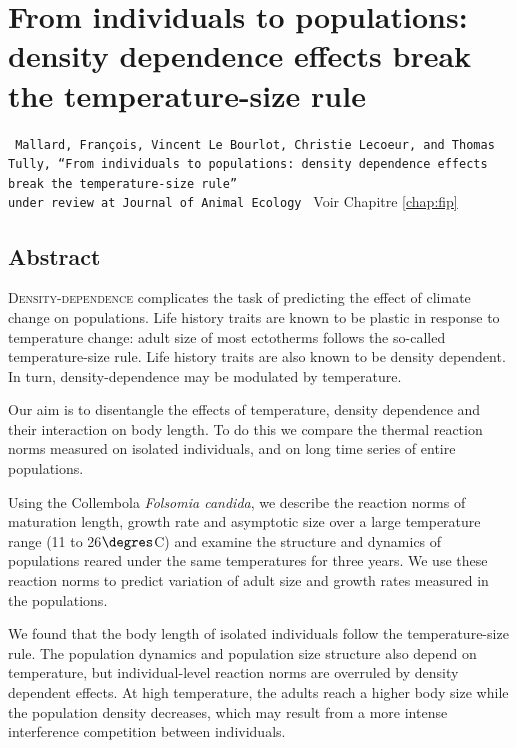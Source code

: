 \chapter{From
individuals to populations:
density dependence effects break the temperature-size rule}
\label{Ann:fip}

\vspace{2cm}
\begin{Spacing}{1}
\texttt{
Mallard, François, Vincent Le Bourlot, Christie Lecoeur, and Thomas Tully, ``From
individuals to populations:
density dependence effects break the temperature-size rule''\\
under review at Journal of Animal Ecology
}
Voir Chapitre \ref{chap:fip}
\end{Spacing}

\section*{Abstract}

\lettrine[lines=3]{D}{ensity-dependence} complicates the task of predicting the
effect of climate change on populations. Life history traits are known to be
plastic in response to temperature change: adult size of most ectotherms follows
the so-called temperature-size rule. Life history traits are also known to be
density dependent. In turn, density-dependence may be modulated by temperature.

Our aim is to disentangle the effects of temperature, density dependence and
their interaction on body length. To do this we compare the thermal reaction
norms measured on isolated individuals, and on long time series of entire
populations.

Using the Collembola \textit{Folsomia candida}, we describe the reaction norms
of maturation length, growth rate and asymptotic size over a large temperature
range (11 to 26$\degres$C) and examine the structure and dynamics of populations
reared under the same temperatures for three years. We use these reaction norms to
predict variation of adult size and growth rates measured in the populations.

We found that the body length of isolated individuals follow the
temperature-size rule. The population dynamics and population size structure
also depend on temperature, but individual-level reaction norms are overruled by
density dependent effects. At high temperature, the adults reach a higher body
size while the population density decreases, which may result from a more
intense interference competition between individuals.

